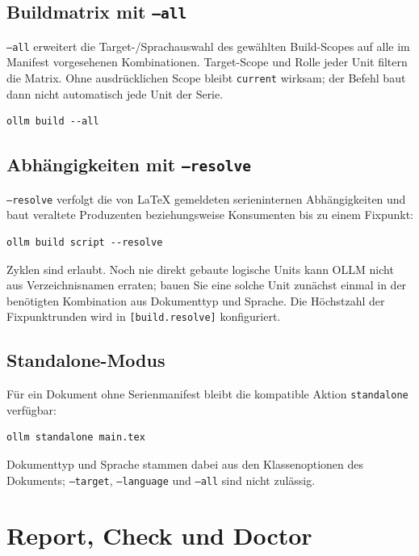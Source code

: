 \documentclass[
load-preamble+
]{osgdoc}
\begin{document}
\subsection{Buildmatrix mit \texttt{--all}}

\texttt{--all} erweitert die Target-/Sprachauswahl des gewählten Build-Scopes
auf alle im Manifest vorgesehenen Kombinationen. Target-Scope und Rolle jeder
Unit filtern die Matrix. Ohne ausdrücklichen Scope bleibt \texttt{current}
wirksam; der Befehl baut dann nicht automatisch jede Unit der Serie.

\begin{verbatim}
ollm build --all
\end{verbatim}

\subsection{Abhängigkeiten mit \texttt{--resolve}}

\texttt{--resolve} verfolgt die von LaTeX gemeldeten serieninternen
Abhängigkeiten und baut veraltete Produzenten beziehungsweise Konsumenten bis
zu einem Fixpunkt:

\begin{verbatim}
ollm build script --resolve
\end{verbatim}

Zyklen sind erlaubt. Noch nie direkt gebaute logische Units kann OLLM nicht
aus Verzeichnisnamen erraten; bauen Sie eine solche Unit zunächst einmal in
der benötigten Kombination aus Dokumenttyp und Sprache. Die Höchstzahl der Fixpunktrunden wird in
\verb|[build.resolve]| konfiguriert.

\subsection{Standalone-Modus}

Für ein Dokument ohne Serienmanifest bleibt die kompatible Aktion
\texttt{standalone} verfügbar:

\begin{verbatim}
ollm standalone main.tex
\end{verbatim}

Dokumenttyp und Sprache stammen dabei aus den Klassenoptionen des Dokuments;
\texttt{--target}, \texttt{--language} und \texttt{--all} sind nicht
zulässig.

\section{Report, Check und Doctor}
\end{document}
